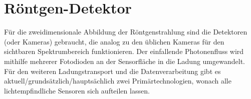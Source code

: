 \chapter{Röntgen-Detektor}
\label{text:moench_theorie}
Für die zweidimensionale Abbildung der Röntgenstrahlung sind die Detektoren (oder Kameras) gebraucht, die analog zu den üblichen Kameras für den sichtbaren Spektrumbereich funktionieren. Der einfallende Photonenfluss wird mithilfe mehrerer Fotodioden an der Sensorfläche in die Ladung umgewandelt. Für den weiteren Ladungstransport und die Datenverarbeitung gibt es aktuell/grundsätzlich/hauptsächlich zwei Primärtechnologien, wonach alle lichtempfindliche Sensoren sich aufteilen lassen.

